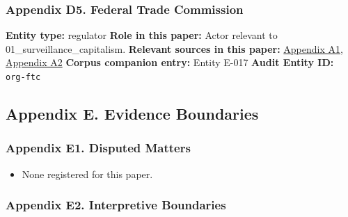 \documentclass[
  american,
  11pt,
  letterpaper,
]{article}
\providecommand{\tightlist}{%
  \setlength{\itemsep}{0pt}\setlength{\parskip}{0pt}}
\begin{document}
\subsubsection{Appendix D5. Federal Trade
Commission}\label{appendix-d5-federal-trade-commission}

\textbf{Entity type:} regulator \textbf{Role in this paper:} Actor
relevant to 01\_surveillance\_capitalism. \textbf{Relevant sources in
this paper:}
\hyperref[appendix-a1-a-look-behind-the-screens-examining-the-data-practices-of-social-media-and-video-streaming-services]{Appendix
A1},
\hyperref[appendix-a2-ftc-imposes-5-billion-penalty-and-sweeping-new-privacy-restrictions-on-facebook]{Appendix
A2} \textbf{Corpus companion entry:} Entity E-017 \textbf{Audit Entity
ID:} \texttt{org-ftc}

\subsection{Appendix E. Evidence
Boundaries}\label{appendix-e.-evidence-boundaries}

\subsubsection{Appendix E1. Disputed
Matters}\label{appendix-e1-disputed-matters}

\begin{itemize}
\tightlist
\item
  None registered for this paper.
\end{itemize}

\subsubsection{Appendix E2. Interpretive
Boundaries}\label{appendix-e2-interpretive-boundaries}
\end{document}
